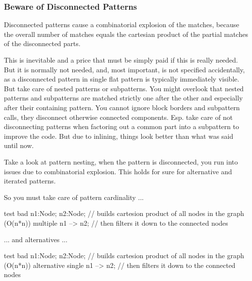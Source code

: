
\subsubsection*{Beware of Disconnected Patterns}
Disconnected patterns cause a combinatorial explosion of the matches, because the overall number of matches equals the cartesian product of the partial matches of the disconnected parts. 

This is inevitable and a price that must be simply paid if this is really needed.
But it is normally not needed, and, most important, is not specified accidentally, as a disconnected pattern in single flat pattern is typically immediately visible.
But take care of nested patterns or subpatterns.
You might overlook that nested patterns and subpatterns are matched strictly one after the other and especially after their containing pattern.
You cannot ignore block borders and subpattern calls, they disconnect otherwise connected components.
Esp. take care of not disconnecting patterns when factoring out a common part into a subpattern to improve the code.
But due to inlining, things look better than what was said until now.

\begin{example}
Take a look at pattern nesting, when the pattern is disconnected, you run into issues due to combinatorial explosion.
This holds for sure for alternative and iterated patterns.

So you must take care of pattern cardinality ...
\begin{grgen}
test bad {
	n1:Node; n2:Node; // builds cartesion product of all nodes in the graph (O(n*n))
  multiple {
		n1 --> n2; // then filters it down to the connected nodes
  }
}
\end{grgen}
... and alternatives ...
\begin{grgen}
test bad {
	n1:Node; n2:Node; // builds cartesion product of all nodes in the graph (O(n*n))
  alternative {
		single {
			n1 --> n2; // then filters it down to the connected nodes
		}
  }
}
\end{grgen}
\end{example}

